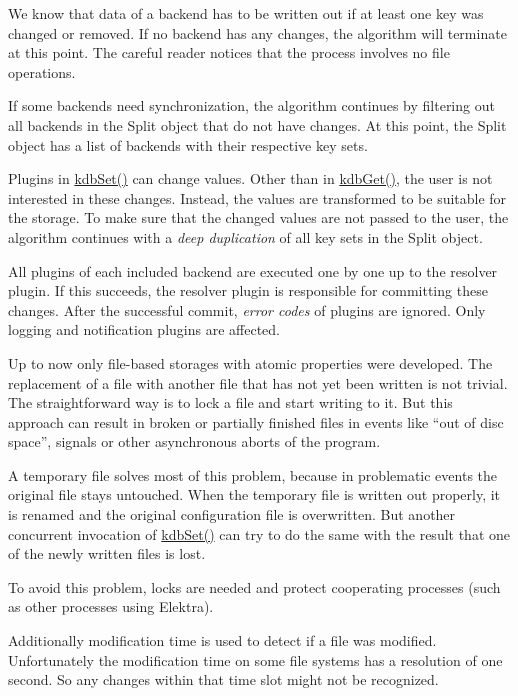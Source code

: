 We know that data of a backend has to be written out if at least one key was changed or removed. If no backend has any changes, the algorithm will terminate at this point. The careful reader notices that the process involves no file operations.

If some backends need synchronization, the algorithm continues by filtering out all backends in the {\ttfamily Split} object that do not have changes. At this point, the {\ttfamily Split} object has a list of backends with their respective key sets.

Plugins in {\ttfamily \mbox{\hyperlink{group__kdb_ga11436b058408f83d303ca5e996832bcf}{kdb\+Set()}}} can change values. Other than in {\ttfamily \mbox{\hyperlink{group__kdb_ga28e385fd9cb7ccfe0b2f1ed2f62453a1}{kdb\+Get()}}}, the user is not interested in these changes. Instead, the values are transformed to be suitable for the storage. To make sure that the changed values are not passed to the user, the algorithm continues with a {\itshape deep duplication} of all key sets in the {\ttfamily Split} object.

All plugins of each included backend are executed one by one up to the resolver plugin. If this succeeds, the resolver plugin is responsible for committing these changes. After the successful commit, {\itshape error codes} of plugins are ignored. Only logging and notification plugins are affected.

Up to now only file-\/based storages with atomic properties were developed. The replacement of a file with another file that has not yet been written is not trivial. The straightforward way is to lock a file and start writing to it. But this approach can result in broken or partially finished files in events like “out of disc space”, signals or other asynchronous aborts of the program.

A temporary file solves most of this problem, because in problematic events the original file stays untouched. When the temporary file is written out properly, it is renamed and the original configuration file is overwritten. But another concurrent invocation of {\ttfamily \mbox{\hyperlink{group__kdb_ga11436b058408f83d303ca5e996832bcf}{kdb\+Set()}}} can try to do the same with the result that one of the newly written files is lost.

To avoid this problem, locks are needed and protect cooperating processes (such as other processes using Elektra).

Additionally modification time is used to detect if a file was modified. Unfortunately the modification time on some file systems has a resolution of one second. So any changes within that time slot might not be recognized.

